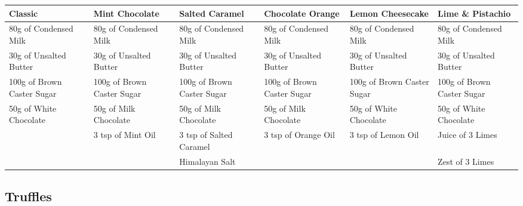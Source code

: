 \documentclass[11pt, english]{article}
\begin{document}
	\begin{table}[h]
	        \scriptsize
	\begin{center}
	\begin{tabular}{p{2cm}p{2cm}p{2cm}p{2cm}p{2cm}p{2cm}}
	        \hline
	        \textbf{Classic} & \textbf{Mint Chocolate} & \textbf{Salted Caramel} & \textbf{Chocolate Orange} & \textbf{Lemon Cheesecake} & \textbf{Lime \& Pistachio}\\
	        \hline
	        80g of Condensed Milk & 80g of Condensed Milk & 80g of Condensed Milk & 80g of Condensed Milk & 80g of Condensed Milk & 80g of Condensed Milk\\
	        30g of Unsalted Butter & 30g of Unsalted Butter & 30g of Unsalted Butter & 30g of Unsalted Butter & 30g of Unsalted Butter & 30g of Unsalted Butter\\
	        100g of Brown Caster Sugar & 100g of Brown Caster Sugar & 100g of Brown Caster Sugar & 100g of Brown Caster Sugar & 100g of Brown Caster Sugar & 100g of Brown Caster Sugar\\
	        50g of White Chocolate & 50g of Milk Chocolate & 50g of Milk Chocolate & 50g of Milk Chocolate & 50g of White Chocolate & 50g of White Chocolate\\
	        & 3 tsp of Mint Oil & 3 tsp of Salted Caramel & 3 tsp of Orange Oil & 3 tsp of Lemon Oil & Juice of 3 Limes\\
	        & & Himalayan Salt & & & Zest of 3 Limes\\
        	\hline
	\end{tabular}
	\end{center}
	\end{table}

\newpage

	\subsection{Truffles}
\end{document}
